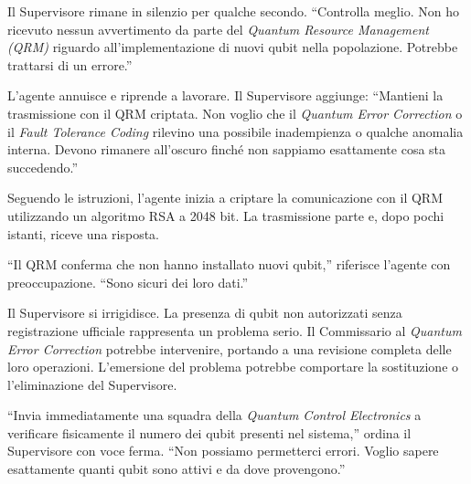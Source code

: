 Il Supervisore rimane in silenzio per qualche secondo. ``Controlla meglio. Non ho ricevuto nessun avvertimento da parte del \textit{Quantum Resource Management (QRM)} riguardo all'implementazione di nuovi qubit nella popolazione. Potrebbe trattarsi di un errore.''

L'agente annuisce e riprende a lavorare. Il Supervisore aggiunge: ``Mantieni la trasmissione con il QRM criptata. Non voglio che il \textit{Quantum Error Correction} o il \textit{Fault Tolerance Coding} rilevino una possibile inadempienza o qualche anomalia interna. Devono rimanere all'oscuro finché non sappiamo esattamente cosa sta succedendo.''

Seguendo le istruzioni, l'agente inizia a criptare la comunicazione con il QRM utilizzando un algoritmo RSA a 2048 bit. La trasmissione parte e, dopo pochi istanti, riceve una risposta.

``Il QRM conferma che non hanno installato nuovi qubit,'' riferisce l'agente con preoccupazione. ``Sono sicuri dei loro dati.''

Il Supervisore si irrigidisce. La presenza di qubit non autorizzati senza registrazione ufficiale rappresenta un problema serio. Il Commissario al \textit{Quantum Error Correction} potrebbe intervenire, portando a una revisione completa delle loro operazioni. L'emersione del problema potrebbe comportare la sostituzione o l'eliminazione del Supervisore.

``Invia immediatamente una squadra della \textit{Quantum Control Electronics} a verificare fisicamente il numero dei qubit presenti nel sistema,'' ordina il Supervisore con voce ferma. ``Non possiamo permetterci errori. Voglio sapere esattamente quanti qubit sono attivi e da dove provengono.''

